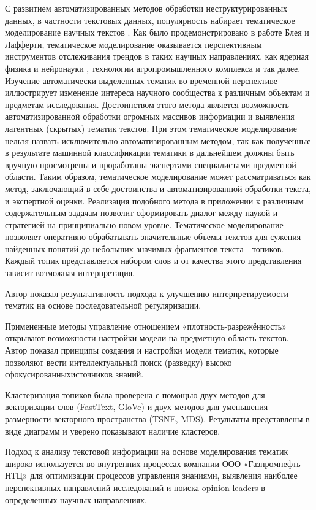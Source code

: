 С развитием автоматизированных методов обработки неструктурированных данных, в частности текстовых данных, популярность набирает тематическое моделирование научных текстов \cite{blei2006dynamic}. Как было продемонстрировано в работе Блея и Лафферти, тематическое моделирование оказывается перспективным инструментов отслеживания трендов в таких научных направлениях, как ядерная физика и нейронауки \cite{Blei:2003}, технологии агропромышленного комплекса \cite{bakhtin2017trend} и так далее. Изучение автоматически выделенных тематик во временной перспективе иллюстрирует изменение интереса научного сообщества к различным объектам и предметам исследования. Достоинством этого метода является возможность автоматизированной обработки огромных массивов информации и выявления латентных (скрытых) тематик текстов. 
При этом тематическое моделирование нельзя назвать исключительно автоматизированным методом, так как полученные в результате машинной классификации тематики в дальнейшем должны быть вручную просмотрены и проработаны экспертами-специалистами предметной области. Таким образом, тематическое моделирование может рассматриваться как метод, заключающий в себе достоинства и автоматизированной обработки текста, и экспертной оценки. Реализация подобного метода в приложении к различным содержательным задачам позволит сформировать диалог между наукой и стратегией на принципиально новом уровне.
% 
Тематическое моделирование позволяет оперативно обрабатывать значительные объемы текстов для сужения найденных понятий до небольших значимых фрагментов текста - топиков. Каждый топик
представляется набором слов и от качества этого представления зависит возможная интерпретация.

Автор показал результативность подхода к улучшению интерпретируемости тематик на основе последовательной регуляризации. 

Примененные методы управление отношением «плотность-разрежённость» открывают возможности настройки модели на предметную область текстов. Автор показал принципы создания и настройки модели тематик, которые позволяют вести интеллектуальный поиск (разведку) высоко сфокусированныхисточников знаний.

Кластеризация топиков была проверена с помощью двух методов для векторизации слов (FastText, GloVe) и двух методов для уменьшения размерности векторного пространства (TSNE, MDS). Результаты представлены в виде диаграмм и уверено показывают наличие кластеров.

Подход к анализу текстовой информации на основе моделирования тематик широко используется во внутренних процессах компании ООО «Газпромнефть НТЦ» для оптимизации процессов управления знаниями, выявления наиболее перспективных направлений исследований и поиска opinion leaders в определенных научных направлениях.


